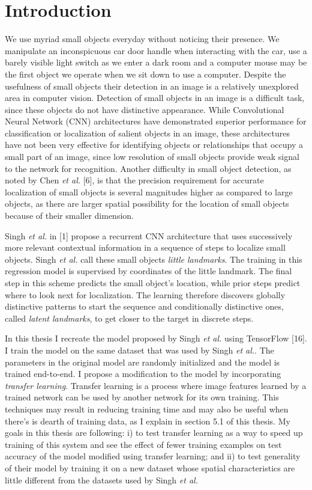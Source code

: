 \documentclass [11pt,letterpaper ,twoside ,openany ]{report}
\begin{document}
    \chapter{Introduction}
    \doublespacing
    We use myriad small objects everyday without noticing their presence. We manipulate an inconspicuous car door handle when interacting with the car, use a barely visible light switch as we enter a dark room and a computer mouse may be the first object we operate when we sit down to use a computer. Despite the usefulness of small objects their detection in an image is a relatively unexplored area in computer vision. Detection of small objects in an image is a difficult task, since these objects do not have distinctive appearance. While Convolutional Neural Network (CNN) architectures have demonstrated superior performance for classification or localization of salient objects in an image, these architectures have not been very effective for identifying objects or relationships that occupy a small part of an image, since low resolution of small objects provide weak signal to the network for recognition. Another difficulty in small object detection, as noted by Chen \textit{et al.} [6], is that the precision requirement for accurate localization of small objects is several magnitudes higher as compared to large objects, as there are larger spatial possibility for the location of small objects because of their smaller dimension.

    Singh \textit{et al.} in [1] propose a recurrent CNN architecture that uses successively more relevant contextual information in a sequence of steps to localize small objects. Singh \textit{et al.} call these small objects \textit {little landmarks}. The training in this regression model is supervised by coordinates of the little landmark. The final step in this scheme predicts the small object's location, while prior steps predict where to look next for localization. The learning therefore discovers globally distinctive patterns to start the sequence and conditionally distinctive ones, called \textit {latent landmarks}, to get closer to the target in discrete steps.

    In this thesis I recreate the model proposed by Singh \textit {et al.} using TensorFlow\textsuperscript{\textregistered} [16]. I train the model on the same dataset that was used by Singh \textit {et al.}. The parameters in the original model are randomly initialized and the model is trained end-to-end. I propose a modification to the model by incorporating \textit {transfer learning}. Transfer learning is a process where image features learned by a trained network can be used by another network for its own training. This techniques may result in reducing training time and may also be useful when there's is dearth of training data, as I explain in section 5.1 of this thesis. My goals in this thesis are following: i) to test transfer learning as a way to speed up training of this system and see the effect of fewer training examples on test accuracy of the model modified using transfer learning; and ii) to test generality of their model by training it on a new dataset whose spatial characteristics are little different from the datasets used by Singh \textit {et al.}
\end{document}
